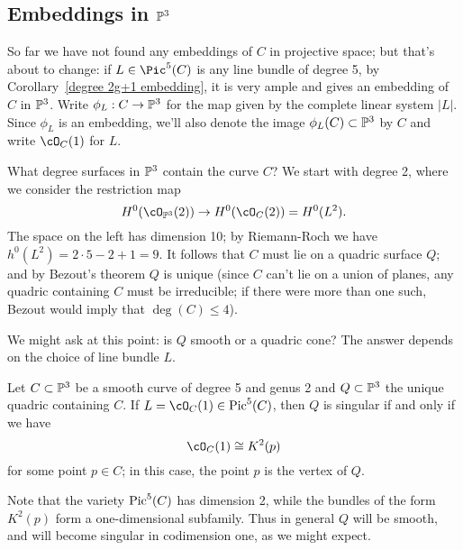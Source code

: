 \subsection{Embeddings in $\PP^3$}

So far we have not found any embeddings of $C$ in projective space; but that's about to change: if $L \in \Pic^5(C)$ is any line bundle of degree 5, by Corollary~\ref{degree 2g+1 embedding}, it is very ample and gives an embedding of $C$ in $\PP^3$.
Write $\phi_L : C \to \PP^3$ for the map given by the complete linear system $|L|$. Since $\phi_L$ is an embedding, we'll also denote the image $\phi_L(C) \subset \PP^3$ by $C$ and write $\cO_C(1)$ for $L$.

What degree surfaces in $\PP^3$ contain the curve $C$? We start with degree 2, where we consider the restriction map
$$
H^0(\cO_{\PP^3}(2)) \to H^0(\cO_C(2)) = H^0(L^2).
$$
The space on the left has dimension 10; by Riemann-Roch we have $h^0(L^2) = 2\cdot5 - 2 + 1 = 9$. It follows that $C$ must lie on a quadric surface $Q$; and by Bezout's  theorem  $Q$ is unique (since $C$ can't lie on a union of planes, any quadric containing $C$ must be irreducible; if there were more than one such, Bezout would imply that $\deg(C) \leq 4$).

We might ask at this point: is $Q$ smooth or a quadric cone? The answer depends on the choice of line bundle $L$. 

\begin{proposition}\label{genus 2 embedding}
Let $C \subset \PP^3$ be a smooth curve of degree 5 and genus 2 and $Q \subset \PP^3$ the unique quadric containing $C$. If $L = \cO_C(1) \in \pic^5(C)$, then $Q$ is singular if and only if we have
$$
\cO_C(1) \cong K^2(p)
$$
for some point $p \in C$; in this case, the point $p$ is the vertex of $Q$.
\end{proposition}

Note that the variety $\pic^5(C)$ has dimension 2, while the bundles of the form $K^2(p)$ form a one-dimensional subfamily. Thus in general $Q$ will be smooth, and will become singular in codimension one, as we might expect.


